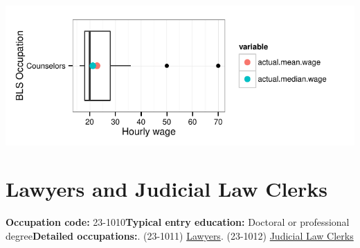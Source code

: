\documentclass[a4paper,10pt]{article}\usepackage[]{graphicx}\usepackage[]{color}
\makeatletter
\def\maxwidth{ %
  \ifdim\Gin@nat@width>\linewidth
    \linewidth
  \else
    \Gin@nat@width
  \fi
}
\makeatother
\begin{document}
{\centering \includegraphics[width=\maxwidth]{figure/unnamed-chunk-251} 

}


\newpage\section{Lawyers and Judicial Law Clerks}\textbf{Occupation code:} 23-1010\newline\textbf{Typical entry education:} Doctoral or professional degree\newline\textbf{Detailed occupations:}. (23-1011)  \href{http://www.bls.gov/oes/current/oes231011.htm}{Lawyers}. (23-1012)  \href{http://www.bls.gov/oes/current/oes231012.htm}{Judicial Law Clerks}\newline%
\end{document}
